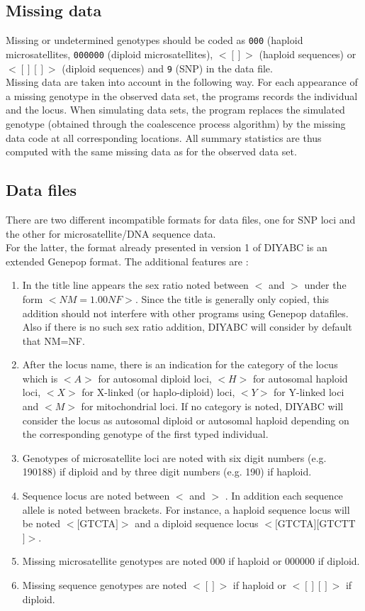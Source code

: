 \subsection{Missing data}
Missing or undetermined genotypes should be coded as \texttt{000} (haploid microsatellites, \texttt{000000}  (diploid microsatellites), \texttt{$<[]>$} (haploid sequences) or \texttt{$<[][]>$} (diploid sequences) and \texttt{9} (SNP) in the data file. \\
Missing data are taken into account in the following way. For each appearance of a missing genotype in the observed data set, the programs records the individual and the locus. When simulating data sets, the program replaces the simulated genotype (obtained through the coalescence process algorithm) by the missing data code at all corresponding locations. All summary statistics are thus computed with the same missing data as for the observed data set. 

\subsection{Data files}
There are two different incompatible formats for data files, one for SNP loci and the other for microsatellite/DNA sequence data.\\ For the latter, the format already presented in version 1 of DIYABC is an extended Genepop format. The additional features are :
\begin{enumerate}
\item In the title line appears the sex ratio noted between \textsf{$<$} and \textsf{$>$} under the form \textsf{$<NM=1.00NF>$}. Since the title is generally only copied, this addition should not interfere with other programs using  Genepop datafiles. Also if there is no such sex ratio addition, DIYABC will consider by default that NM=NF.
\item After the locus name, there is an indication for the category of the locus which is $<A>$ for autosomal diploid loci, $<H>$ for autosomal haploid loci, $<X>$ for X-linked (or haplo-diploid) loci, $<Y>$ for Y-linked loci and $<M>$ for mitochondrial loci. If no category is noted, DIYABC will consider the locus as autosomal diploid or autosomal haploid depending on the corresponding genotype of the first typed individual.
\item Genotypes of microsatellite loci are noted with six digit numbers (e.g. 190188) if diploid and by three digit numbers (e.g. 190) if haploid.
\item Sequence locus are noted between  \textsf{$<$} and \textsf{$>$} . In addition each sequence allele is noted between brackets. For instance, a haploid sequence locus  will be noted $<[$GTCTA$]>$ and a diploid sequence locus $<[$GTCTA$][$GTCTT$]>$.
\item Missing microsatellite genotypes are noted \textsf{000} if haploid or \textsf{000000} if diploid.
\item Missing sequence genotypes are noted $<[]>$ if haploid or $<[][]>$ if diploid.
\end{enumerate}

